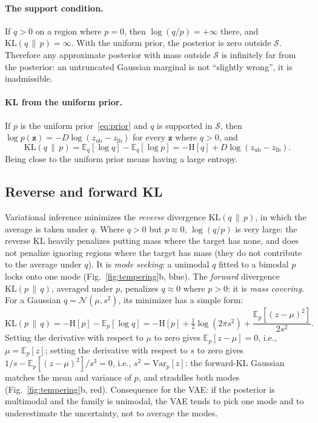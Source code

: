 \documentclass[11pt,a4paper]{article}
\numberwithin{equation}{section}
\theoremstyle{plain}
\theoremstyle{definition}
\theoremstyle{remark}
\newcommand{\z}{\mathbf{z}}
\newcommand{\Sset}{\mathcal{S}}
\newcommand{\E}{\mathbb{E}}
\newcommand{\Var}{\mathrm{Var}}
\newcommand{\KL}{\mathrm{KL}}
\newcommand{\Hent}{\mathrm{H}}
\newcommand{\N}{\mathcal{N}}
\newcommand{\zlb}{z_{\text{lb}}}
\newcommand{\zub}{z_{\text{ub}}}
\begin{document}
\paragraph{The support condition.} If $q>0$ on a region where $p=0$, then $\log(q/p)=+\infty$ there, and $\KL(q\,\|\,p)=\infty$. With the uniform prior, the posterior is zero outside $\Sset$. Therefore any approximate posterior with mass outside $\Sset$ is infinitely far from the posterior: an untruncated Gaussian marginal is not ``slightly wrong'', it is inadmissible.

\paragraph{KL from the uniform prior.} If $p$ is the uniform prior~\eqref{eq:prior} and $q$ is supported in $\Sset$, then $\log p(\z)=-D\log(\zub-\zlb)$ for every $\z$ where $q>0$, and
\begin{equation}
\KL(q\,\|\,p)=\E_q[\log q]-\E_q[\log p]=-\Hent[q]+D\log(\zub-\zlb).
\label{eq:kl_uniform}
\end{equation}
Being close to the uniform prior means having a large entropy.

\subsection{Reverse and forward KL}
\label{sec:reverse_kl}
Variational inference minimizes the \emph{reverse} divergence $\KL(q\,\|\,p)$, in which the average is taken under $q$.
Where $q>0$ but $p\approx0$, $\log(q/p)$ is very large: the reverse KL heavily penalizes putting mass where the target has none, and does not penalize ignoring regions where the target has mass (they do not contribute to the average under $q$). It is \emph{mode seeking}: a unimodal $q$ fitted to a bimodal $p$ locks onto one mode (Fig.~\ref{fig:tempering}b, blue).
The \emph{forward} divergence $\KL(p\,\|\,q)$, averaged under $p$, penalizes $q\approx0$ where $p>0$: it is \emph{mass covering}. For a Gaussian $q=\N(\mu,s^2)$, its minimizer has a simple form:
\begin{equation*}
\KL(p\,\|\,q)=-\Hent[p]-\E_p[\log q]=-\Hent[p]+\tfrac12\log(2\pi s^2)+\frac{\E_p[(z-\mu)^2]}{2s^2}.
\end{equation*}
Setting the derivative with respect to $\mu$ to zero gives $\E_p[z-\mu]=0$, i.e., $\mu=\E_p[z]$; setting the derivative with respect to $s$ to zero gives $1/s-\E_p[(z-\mu)^2]/s^3=0$, i.e., $s^2=\Var_p[z]$: the forward-KL Gaussian matches the mean and variance of $p$, and straddles both modes (Fig.~\ref{fig:tempering}b, red).
Consequence for the VAE: if the posterior is multimodal and the family is unimodal, the VAE tends to pick one mode and to underestimate the uncertainty, not to average the modes.
\end{document}
